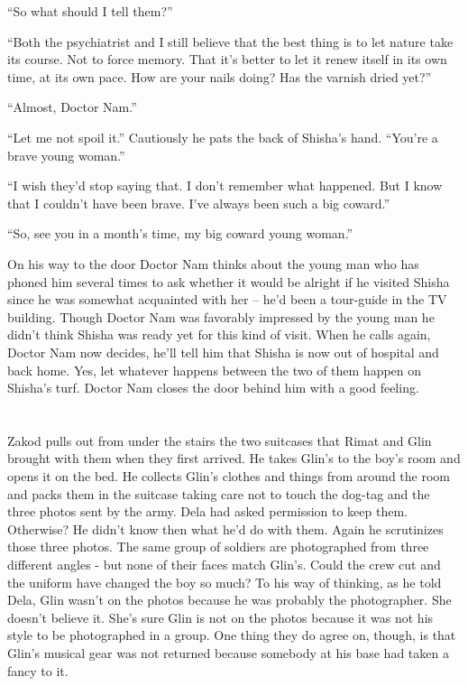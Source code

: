\documentclass[twoside,11pt]{book}
\begin{document}
``So what should I tell them?''

``Both the psychiatrist and I still believe that the best thing is to let nature take its course. Not to
force memory. That it's better to let it renew itself in its own time, at its own pace. How are your nails doing? Has
the varnish dried yet?''

``Almost, Doctor Nam.''

``Let me not spoil it.'' Cautiously he pats the back of Shisha's hand. ``You're a
brave young woman.''

``I wish they'd stop saying that. I don't remember what happened. But I know that I couldn't have been
brave. I've always been such a big coward.''

``So, see you in a month's time, my big coward young woman.''

On his way to the door Doctor Nam thinks about the young man who has phoned him several times to ask whether it would be
alright if he visited Shisha since he was somewhat acquainted with her -- he'd been a tour-guide in the TV building.
Though Doctor Nam was favorably impressed by the young man he didn't think Shisha was ready yet for this kind of visit.
When he calls again, Doctor Nam now decides, he'll tell him that Shisha is now out of hospital and back home. Yes, let
whatever happens between the two of them happen on Shisha's turf. Doctor Nam closes the door behind him with a good
feeling.


\bigskip

\chapter{}

Zakod pulls out from under the stairs the two suitcases that Rimat and Glin brought with them when they first arrived.
He takes Glin's to the boy's room and opens it on the bed. He collects Glin's clothes and things from around the room
and packs them in the suitcase taking care not to touch the dog-tag and the three photos sent by the army. Dela
had asked permission to keep them. Otherwise? He didn't know then what he'd do with them. Again he scrutinizes those
three photos. The same group of soldiers are photographed from three different angles - but none of their faces match
Glin's. Could the crew cut and the uniform have changed the boy so much? To his way of thinking, as he told Dela,
Glin wasn't on the photos because he was probably the photographer. She doesn't believe it. She's sure Glin is not on
the photos because it was not his style to be photographed in a group. One thing they do agree on, though, is that
Glin's musical gear was not returned because somebody at his base had taken a fancy to it.
\end{document}
